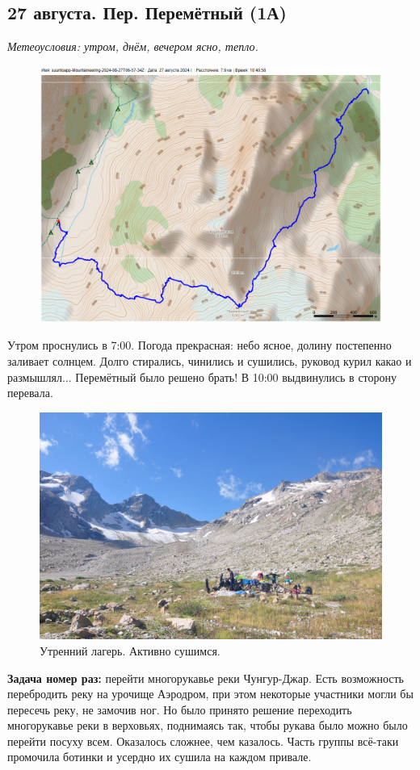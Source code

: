 \subsection{27 августа. Пер. Перемётный (1А)}
\textit{Метеоусловия: утром, днём, вечером ясно, тепло.}

\begin{figure}[h!]
	\centering
	\includegraphics[angle=0, width=0.7\linewidth]{../pics/mini_maps/27}
	\label{fig:mini_27}
\end{figure}

Утром проснулись в 7:00. Погода прекрасная: небо ясное, долину постепенно заливает солнцем. Долго стирались, чинились и сушились, руковод курил какао и размышлял... Перемётный было решено брать!
В 10:00 выдвинулись в сторону перевала.

\begin{figure}[h!]
	\centering
	\includegraphics[width=0.7\linewidth]{../pics/DSC_0251.jpg}
	\caption{Утренний лагерь. Активно сушимся.}
	\label{fig:DSC_0251}
\end{figure}

\textbf{Задача номер раз:} перейти многорукавье реки Чунгур-Джар. Есть возможность перебродить реку на урочище Аэродром, при этом некоторые участники могли бы пересечь реку, не замочив ног. Но было принято решение переходить многорукавье реки в верховьях, поднимаясь так, чтобы рукава было можно было перейти посуху всем. Оказалось сложнее, чем казалось. Часть группы всё-таки промочила ботинки и усердно их сушила на каждом привале. 




